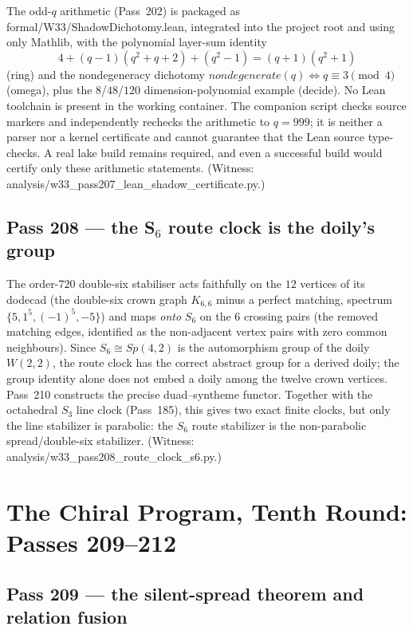 \documentclass[12pt,a4paper]{article}
\def\mathrm#1{#1}%
\def\texttt#1{#1}%
\def\text#1{#1}%
\theoremstyle{definition}
\newcommand{\Sp}{\mathrm{Sp}}
\begin{document}
The odd-$q$ arithmetic (Pass~202) is packaged as
\texttt{formal/W33/ShadowDichotomy.lean}, integrated into the project root
and using only \texttt{Mathlib}, with the polynomial layer-sum identity
\[
  4 + (q-1)(q^2+q+2) + (q^2-1) = (q+1)(q^2+1)
\]
(\texttt{ring}) and the nondegeneracy dichotomy
$\text{nondegenerate}(q)\iff q\equiv3\pmod4$ (\texttt{omega}), plus the
$8$/$48$/$120$ dimension-polynomial example (\texttt{decide}). No Lean
toolchain is present in the working container.  The companion script checks
source markers and independently rechecks the arithmetic to $q=999$; it is
neither a parser nor a kernel certificate and cannot guarantee that the
Lean source type-checks.  A real \texttt{lake build} remains required, and
even a successful build would certify only these arithmetic statements.
(Witness:
\texttt{analysis/w33\_pass207\_lean\_shadow\_certificate.py}.)

\subsection{Pass 208 --- the S$_6$ route clock is the doily's group}
\label{ssec:pass208}

The order-$720$ double-six stabiliser acts faithfully on the $12$ vertices
of its dodecad (the double-six crown graph $K_{6,6}$ minus a perfect
matching, spectrum $\{5,1^5,(-1)^5,-5\}$) and maps \emph{onto} $S_6$ on
the $6$ crossing pairs (the removed matching edges, identified as the
non-adjacent vertex pairs with zero common neighbours). Since $S_6\cong
\Sp(4,2)$ is the automorphism group of the doily $W(2,2)$, the route clock
has the correct abstract group for a derived doily; the group identity
alone does not embed a doily among the twelve crown vertices.  Pass~210
constructs the precise duad--syntheme functor. Together with the octahedral
$S_3$ line clock (Pass~185), this gives two exact finite clocks, but only the
line stabilizer is parabolic: the $S_6$ route stabilizer is the non-parabolic
spread/double-six stabilizer. (Witness:
\texttt{analysis/w33\_pass208\_route\_clock\_s6.py}.)

\section{The Chiral Program, Tenth Round: Passes 209--212}
\label{sec:chiral-program-ten}

\subsection{Pass 209 --- the silent-spread theorem and relation fusion}
\label{ssec:pass209}
\end{document}
